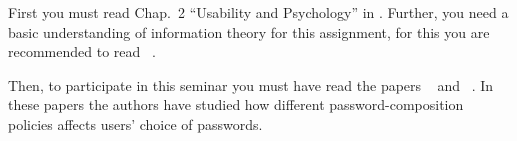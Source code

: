 First you must read Chap.~2 \enquote{Usability and Psychology} in 
\cite{Anderson2008sea}.
Further, you need a basic understanding of information theory 
\cite{Shannon1948amt} for this assignment, for this you are recommended to read 
~\cite{Ueltschi2013se}.

Then, to participate in this seminar you must have read the papers 
~\cite{Komanduri2011opa} and 
~\cite{Komanduri2014can}.
In these papers the authors have studied how different password-composition 
policies affects users' choice of passwords.
